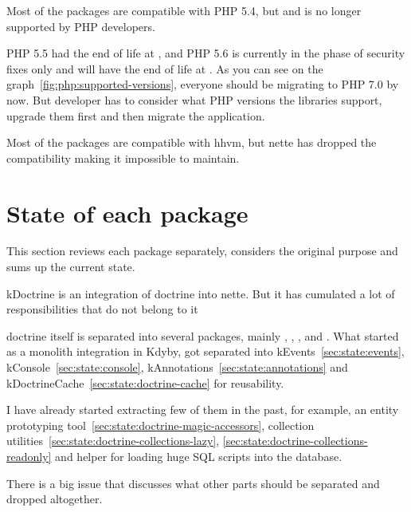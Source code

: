 Most of the packages are compatible with PHP 5.4, but  and is no longer supported by PHP developers.

PHP 5.5 had the end of life at , and PHP 5.6 is currently in the phase of security fixes only and will have the end of life at . As you can see on the graph~\ref{fig:php:supported-versions}, everyone should be migrating to PHP 7.0 by now. But developer has to consider what PHP versions the libraries support, upgrade them first and then migrate the application.

Most of the packages are compatible with \gls{hhvm}, but \gls{nette} has dropped the compatibility making it impossible to maintain.

\section{State of each package}

This section reviews each package separately, considers the original purpose and sums up the current state.

 \label{sec:state:doctrine}

\gls{kDoctrine} is an integration of \gls{doctrine} into \gls{nette}. But it has cumulated a lot of responsibilities that do not belong to it

\gls{doctrine} itself is separated into several packages, mainly , , ,  and . What started as a monolith integration in Kdyby, got separated into \gls{kEvents}~\ref{sec:state:events}, \gls{kConsole}~\ref{sec:state:console}, \gls{kAnnotations}~\ref{sec:state:annotations} and \gls{kDoctrineCache}~\ref{sec:state:doctrine-cache} for reusability.

I have already started extracting few of them in the past, for example, an entity prototyping tool~\ref{sec:state:doctrine-magic-accessors}, collection utilities~\ref{sec:state:doctrine-collections-lazy}, \ref{sec:state:doctrine-collections-readonly} and helper for loading huge SQL scripts into the database.

There is a big issue  that discusses what other parts should be separated and dropped altogether.

